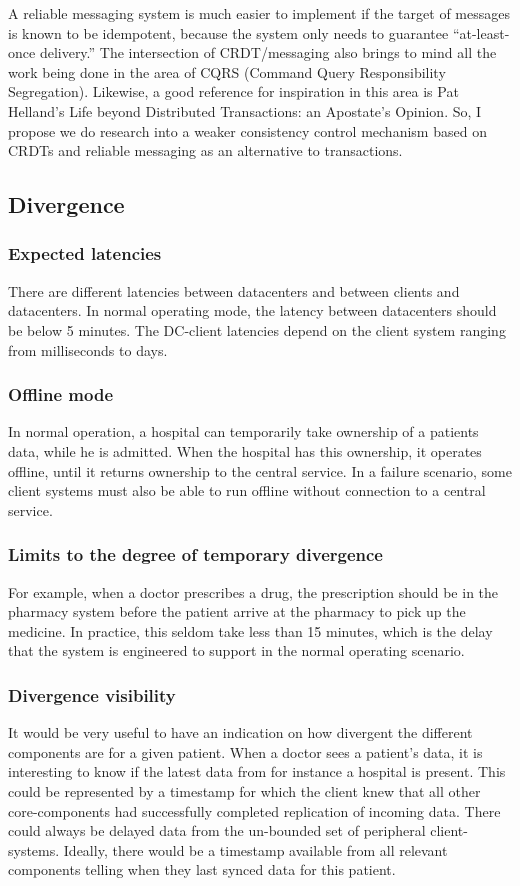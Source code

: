 \documentclass[11pt,a4paper]{report}
\begin{document}
A reliable messaging system is much easier to implement if the target of messages is known to be idempotent, because the system only needs to guarantee ``at-least-once delivery.''
The intersection of CRDT/messaging also brings to mind all the work being done in the area of CQRS (Command Query Responsibility Segregation). Likewise, a good reference for inspiration in this area is Pat Helland's Life beyond Distributed Transactions: an Apostate's Opinion. So, I propose we do research into a weaker consistency control mechanism based on CRDTs and reliable messaging as an alternative to transactions.

\subsection{Divergence}
\subsubsection{Expected latencies}
There are different latencies between datacenters and between clients and datacenters.
In normal operating mode, the latency between datacenters should be below 5 minutes.
The DC-client latencies depend on the client system ranging from milliseconds to days.
\subsubsection{Offline mode}
In normal operation, a hospital can temporarily take ownership of a patients data, while he is admitted. When the hospital has this ownership, it operates offline, until it returns ownership to the central service.
In a failure scenario, some client systems must also be able to run offline without connection to a central service.
\subsubsection{Limits to the degree of temporary divergence}
For example, when a doctor prescribes a drug, the prescription should be in the pharmacy system before the patient arrive at the pharmacy to pick up the medicine. In practice, this seldom take less than 15 minutes, which is the delay that the system is engineered to support in the normal operating scenario.
\subsubsection{Divergence visibility}
It would be very useful to have an indication on how divergent the different components are for a given patient. When a doctor sees a patient's data, it is interesting to know if the latest data from for instance a hospital is present.
This could be represented by a timestamp for which the client knew that all other core-components had successfully completed replication of incoming data. 
There could always be delayed data from the un-bounded set of peripheral client-systems. Ideally, there would be a timestamp available from all relevant components telling when they last synced data for this patient.
\end{document}

